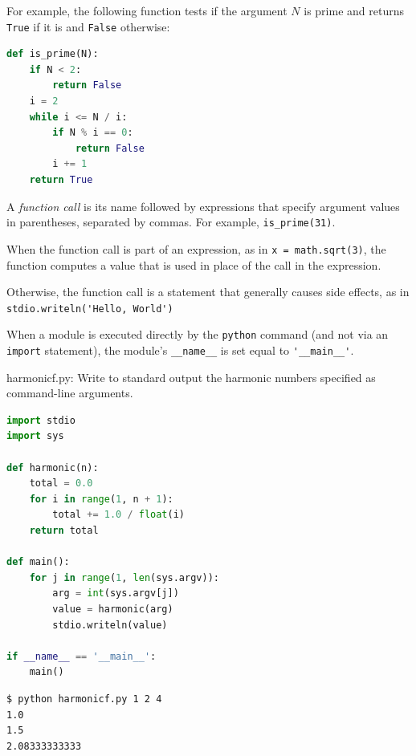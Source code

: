 \documentclass[8pt,a4paper,compress,handout]{beamer}
\begin{document}
\begin{frame}[fragile]
For example, the following function tests if the argument $N$ is prime and returns \lstinline{True} if it is and \lstinline{False} otherwise:

\begin{lstlisting}[language=Python]
def is_prime(N):
    if N < 2: 
        return False
    i = 2
    while i <= N / i:
        if N % i == 0:
            return False
        i += 1
    return True
\end{lstlisting}

\bigskip

A \emph{function call} is its name followed by expressions that specify argument values in parentheses, separated by commas. For example, \lstinline{is_prime(31)}.

\bigskip

When the function call is part of an expression, as in \lstinline{x = math.sqrt(3)}, the function computes a value that is used in place of the call in the expression. 

\bigskip

Otherwise, the function call is a statement that generally causes side effects, as in \lstinline{stdio.writeln('Hello, World')}

\bigskip

When a module is executed directly by the \lstinline{python} command (and not via an \lstinline{import} statement), the module's \lstinline{__name__} is set equal to \lstinline{'__main__'}.
\end{frame}

\begin{frame}[fragile]
\begin{framed}
\tiny harmonicf.py:  Write to standard output the harmonic numbers specified as command-line arguments.
\end{framed}

\begin{lstlisting}[language=Python]
import stdio
import sys

def harmonic(n):
    total = 0.0
    for i in range(1, n + 1):
        total += 1.0 / float(i)
    return total

def main():
    for j in range(1, len(sys.argv)):
        arg = int(sys.argv[j])
        value = harmonic(arg)
        stdio.writeln(value)

if __name__ == '__main__':
    main()
\end{lstlisting}

\begin{lstlisting}[language={}]
$ python harmonicf.py 1 2 4
1.0
1.5
2.08333333333
\end{lstlisting}
\end{frame}
\end{document}
